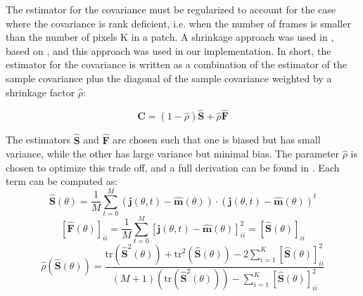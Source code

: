 \documentclass[twocolumn,fleqn]{aastex62}
\begin{document}
The estimator for the covariance must be regularized to account for the case where the covariance is rank deficient, i.e. when the number of frames is smaller than the number of pixels K in a patch.
A shrinkage approach was used in \cite{}, based on \cite{}, and this approach was used in our implementation.
In short, the estimator for the covariance is written as a combination of the estimator of the sample covariance plus the diagonal of the sample covariance weighted by a shrinkage factor $\hat{\rho}$:

\begin{equation}
\hat{\mathbf{C}} = (1-\hat{\rho})\hat{\mathbf{S}} + \hat{\rho}\hat{\mathbf{F}}
\end{equation}

The estimators $\hat{\mathbf{S}}$ and $\hat{\mathbf{F}}$ are chosen such that one is biased but has small variance, while the other has large variance but minimal bias. 
The parameter $\hat{\rho}$ is chosen to optimize this trade off, and a full derivation can be found in \cite{}.
Each term can be computed as:
\begin{equation}
\hat{\mathbf{S}}(\theta) = \frac{1}{M}\sum_{t = 0}^{M}\left( \mathbf{j}(\theta,t) - \hat{\mathbf{m}}(\theta)\right) \cdot\left( \mathbf{j}(\theta,t) - \hat{\mathbf{m}}(\theta)\right)^{t}
\end{equation}
\begin{equation}
\left[\hat{\mathbf{F}}(\theta)\right]_{ii} = \frac{1}{M}\sum_{t = 0}^{M}\left[ \mathbf{j}(\theta,t) - \hat{\mathbf{m}}(\theta)\right]^{2}_{ii} = \left[\hat{\mathbf{S}}(\theta)\right]_{ii}
\end{equation}
\begin{equation}
\hat{\rho}\left(\hat{\mathbf{S}}(\theta)\right) = \frac{\textrm{tr}\left(\hat{\mathbf{S}}^{2}(\theta)\right) +
\textrm{tr}^{2}\left(\hat{\mathbf{S}}(\theta)\right) -
2\sum_{i=1}^{K}\left[\hat{\mathbf{S}}(\theta)\right]^{2}_{ii}}{(M+1)\left(\textrm{tr}\left(\hat{\mathbf{S}}^{2}(\theta)\right)\right) -
\sum_{i=1}^{K}\left[\hat{\mathbf{S}}(\theta)\right]^{2}_{ii}}
\end{equation}
\end{document}
